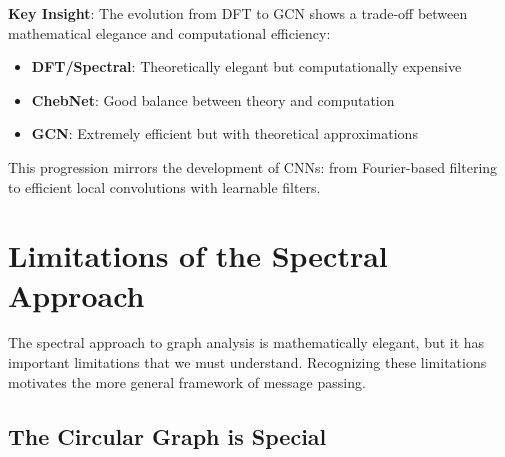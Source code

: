 \begin{notechapter}
\begin{center}
\end{center}

\textbf{Key Insight}: The evolution from DFT to GCN shows a trade-off between 
mathematical elegance and computational efficiency:
\begin{itemize}
\item \textbf{DFT/Spectral}: Theoretically elegant but computationally expensive
\item \textbf{ChebNet}: Good balance between theory and computation
\item \textbf{GCN}: Extremely efficient but with theoretical approximations
\end{itemize}

This progression mirrors the development of CNNs: from Fourier-based filtering 
to efficient local convolutions with learnable filters.

\section{Limitations of the Spectral Approach}

The spectral approach to graph analysis is mathematically elegant, but 
it has important limitations that we must understand. Recognizing these 
limitations motivates the more general framework of message passing.

\subsection{The Circular Graph is Special}


\end{notechapter}
